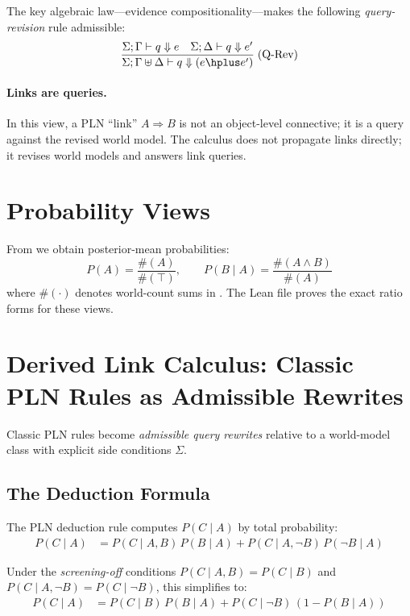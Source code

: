 \documentclass[11pt,openany]{report}
\begin{document}
The key algebraic law---evidence compositionality---makes the following
\emph{query-revision} rule admissible:
\[
\frac{\Sigma; \Gamma \vdash q \Downarrow e \quad
      \Sigma; \Delta \vdash q \Downarrow e'}
     {\Sigma; \Gamma \uplus \Delta \vdash q \Downarrow (e \hplus e')}
\;(\text{Q-Rev})
\]

\paragraph{Links are queries.}
In this view, a PLN ``link'' $A \Rightarrow B$ is not an object-level
connective; it is a query  against the revised world model.
The calculus does not propagate links directly; it revises world models and
answers link queries.

\section{Probability Views}

From \Evidence{} we obtain posterior-mean probabilities:
\[
  P(A) = \frac{\#(A)}{\#(\top)}, \qquad
  P(B \mid A) = \frac{\#(A \wedge B)}{\#(A)}
\]
where $\#(\cdot)$ denotes world-count sums in \JointEvidence{}.  The Lean
file  proves
the exact ratio forms for these views.

\section{Derived Link Calculus: Classic PLN Rules as Admissible Rewrites}

Classic PLN rules become \emph{admissible query rewrites} relative to a
world-model class with explicit side conditions $\Sigma$.

\subsection{The Deduction Formula}

The PLN deduction rule computes $P(C \mid A)$ by total probability:
\begin{align}
  P(C \mid A) &= P(C \mid A, B)\,P(B \mid A) + P(C \mid A, \lnot B)\,P(\lnot B \mid A)
  \label{eq:total-prob}
\end{align}

Under the \emph{screening-off} conditions
$P(C \mid A, B) = P(C \mid B)$ and
$P(C \mid A, \lnot B) = P(C \mid \lnot B)$, this simplifies to:
\begin{align}
  P(C \mid A) &= P(C \mid B)\,P(B \mid A)
    + P(C \mid \lnot B)\,(1 - P(B \mid A))
  \label{eq:deduction-screened}
\end{align}
\end{document}
